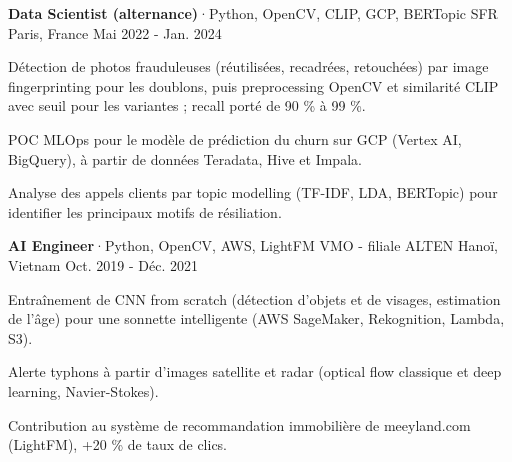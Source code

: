 \begin{cventries}
  \cventry
    {\textbf{Data Scientist (alternance)}{\enskip·\enskip}{\fontsize{7.5pt}{1em}\selectfont Python, OpenCV, CLIP, GCP, BERTopic}} %
    {SFR} %
    {Paris, France} %
    {Mai 2022 - Jan. 2024} %
    {
      \begin{cvitems} %
        \item {Détection de photos frauduleuses (réutilisées, recadrées, retouchées) par image fingerprinting pour les doublons, puis preprocessing OpenCV et similarité CLIP avec seuil pour les variantes ; recall porté de 90 \% à 99 \%.}
        \item {POC MLOps pour le modèle de prédiction du churn sur GCP (Vertex AI, BigQuery), à partir de données Teradata, Hive et Impala.}
        \item {Analyse des appels clients par topic modelling (TF-IDF, LDA, BERTopic) pour identifier les principaux motifs de résiliation.}
      \end{cvitems}
    }


  \cventry
    {\textbf{AI Engineer}{\enskip·\enskip}{\fontsize{7.5pt}{1em}\selectfont Python, OpenCV, AWS, LightFM}} %
    {VMO - filiale ALTEN} %
    {Hanoï, Vietnam} %
    {Oct. 2019 - Déc. 2021} %
    {
      \begin{cvitems} %
        \item {Entraînement de CNN from scratch (détection d’objets et de visages, estimation de l’âge) pour une sonnette intelligente (AWS SageMaker, Rekognition, Lambda, S3).}
        \item {Alerte typhons à partir d’images satellite et radar (optical flow classique et deep learning, Navier-Stokes).}
        \item {Contribution au système de recommandation immobilière de meeyland.com (LightFM), +20 \% de taux de clics.}
      \end{cvitems}
    }

\end{cventries}
